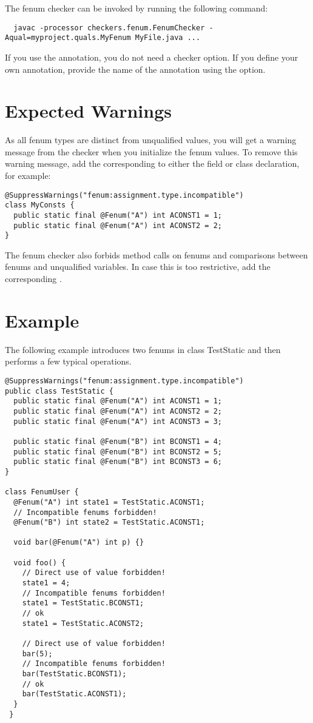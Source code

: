 The fenum checker can be invoked by running the following
command:

\begin{Verbatim}
  javac -processor checkers.fenum.FenumChecker -Aqual=myproject.quals.MyFenum MyFile.java ...
\end{Verbatim}

If you use the  annotation, you do not need a checker option.
If you define your own annotation, provide the name of the annotation using the  option.


\section{Expected Warnings}

As all fenum types are distinct from unqualified values, you will get a warning
message from the checker when you initialize the fenum values.
To remove this warning message, add the corresponding  to either
the field or class declaration, for example:

\begin{Verbatim}
@SuppressWarnings("fenum:assignment.type.incompatible")
class MyConsts {
  public static final @Fenum("A") int ACONST1 = 1;
  public static final @Fenum("A") int ACONST2 = 2;  
}
\end{Verbatim}

The fenum checker also forbids method calls on fenums and comparisons between fenums and
unqualified variables. In case this is too restrictive, add the corresponding
.  


\section{Example}

The following example introduces two fenums in class TestStatic
and then performs a few typical operations.

\begin{Verbatim}
@SuppressWarnings("fenum:assignment.type.incompatible")
public class TestStatic {
  public static final @Fenum("A") int ACONST1 = 1;
  public static final @Fenum("A") int ACONST2 = 2;
  public static final @Fenum("A") int ACONST3 = 3;

  public static final @Fenum("B") int BCONST1 = 4;
  public static final @Fenum("B") int BCONST2 = 5;
  public static final @Fenum("B") int BCONST3 = 6;
}

class FenumUser {
  @Fenum("A") int state1 = TestStatic.ACONST1;
  // Incompatible fenums forbidden!
  @Fenum("B") int state2 = TestStatic.ACONST1;

  void bar(@Fenum("A") int p) {}
	
  void foo() {
    // Direct use of value forbidden!
    state1 = 4;
    // Incompatible fenums forbidden!
    state1 = TestStatic.BCONST1;
    // ok
    state1 = TestStatic.ACONST2;
		
    // Direct use of value forbidden!
    bar(5);
    // Incompatible fenums forbidden!
    bar(TestStatic.BCONST1);
    // ok
    bar(TestStatic.ACONST1);
  }
 }
\end{Verbatim}

